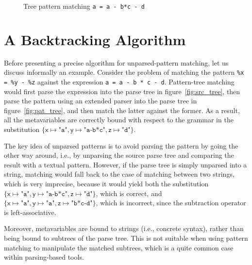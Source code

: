 
\begin{figure}[b]
\caption{Tree pattern matching \texttt{a = a - b*c - d}}
\label{fig:match_ex}
\end{figure}


\section{A Backtracking Algorithm}
\label{backtracking}

Before presenting a precise algorithm for unparsed\hyp{}pattern
matching, let us discuss informally an example. Consider the problem
of matching the pattern \texttt{\%x = \%y - \%z} against the \Clang
expression \texttt{a = a - b * c - d}. Pattern\hyp{}tree matching
would first parse the expression into the parse tree in
figure~\ref{fig:src_tree}, then parse the pattern using an extended
parser into the parse tree in figure~\ref{fig:pat_tree}, and then
match the latter against the former. As a result, all the
meta\-variables are correctly bound with respect to the grammar in the
substitution \(\{\textsf{x} \mapsto \texttt{"a"}, \textsf{y} \mapsto
\texttt{"a-b*c"}, \textsf{z} \mapsto \texttt{"d"}\}\).

The key idea of unparsed patterns is to avoid parsing the pattern by
going the other way around, i.e., by unparsing the source parse tree
and comparing the result with a textual pattern. However, if the parse
tree is simply unparsed into a string, matching would fall back to the
case of matching between two strings, which is very imprecise, because
it would yield both the substitution \(\{\textsf{x} \mapsto
\texttt{"a"}, \textsf{y} \mapsto \texttt{"a-b*c"}, \textsf{z} \mapsto
\texttt{"d"}\}\), which is correct, and \(\{\textsf{x} \mapsto
\texttt{"a"}, \textsf{y} \mapsto \texttt{"a"}, \textsf{z} \mapsto
\texttt{"b*c-d"}\}\), which is incorrect, since the subtraction
operator is left\hyp{}associative.

Moreover, meta\-variables are bound to strings (i.e., concrete
syntax), rather than being bound to subtrees of the parse tree. This
is not suitable when using pattern matching to manipulate the matched
subtrees, which is a quite common case within parsing\hyp{}based
tools.

